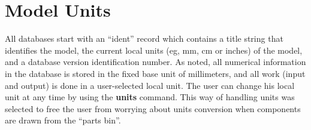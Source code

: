 \section{Model Units}

All databases start with an ``ident'' record which contains
a title string that identifies the model, the
current local units (eg, mm, cm or inches) of the model,
and a database version identification number.
As noted, all numerical information
in the database is stored in the fixed base
unit of millimeters,
and all work (input and output) is done in a user-selected local unit.
The user can change his local unit at any time
by using the {\bf units} command.
This way of handling units was selected to free the user from worrying
about units conversion when components are drawn from the ``parts bin''.
